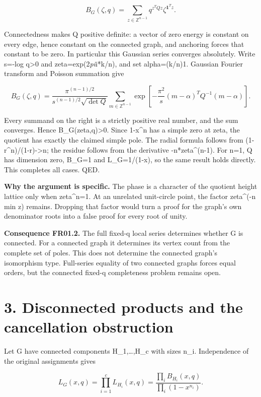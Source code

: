 \documentclass[
  11pt,
  a4paper,
]{report}
\begin{document}
\[
 B_G(\zeta,q)
    =\sum_{z\in\mathbb Z^{n-1}}
       q^{z^TQz}\zeta^{\mathbf1^Tz}.
\]

Connectedness makes Q positive definite: a vector of zero energy is
constant on every edge, hence constant on the connected graph, and
anchoring forces that constant to be zero. In particular this Gaussian
series converges absolutely. Write s=-log q\textgreater0 and
zeta=exp(2\emph{pi}i*k/n), and set alpha=(k/n)1. Gaussian Fourier
transform and Poisson summation give

\[
 \boxed{
 B_G(\zeta,q)=
 \frac{\pi^{(n-1)/2}}{s^{(n-1)/2}\sqrt{\det Q}}
 \sum_{m\in\mathbb Z^{n-1}}
 \exp\!\left[-\frac{\pi^2}{s}
 (m-\alpha)^TQ^{-1}(m-\alpha)\right].}
\]

Every summand on the right is a strictly positive real number, and the
sum converges. Hence B\_G(zeta,q)\textgreater0. Since 1-x\^{}n has a
simple zero at zeta, the quotient has exactly the claimed simple pole.
The radial formula follows from (1-r\^{}n)/(1-r)-\textgreater n; the
residue follows from the derivative -n*zeta\^{}(n-1). For n=1, Q has
dimension zero, B\_G=1 and L\_G=1/(1-x), so the same result holds
directly. This completes all cases. QED.

\textbf{Why the argument is specific.} The phase is a character of the
quotient height lattice only when zeta\^{}n=1. At an unrelated
unit-circle point, the factor zeta\^{}(-n min z) remains. Dropping that
factor would turn a proof for the graph's own denominator roots into a
false proof for every root of unity.

\textbf{Consequence FR01.2.} The full fixed-q local series determines
whether G is connected. For a connected graph it determines its vertex
count from the complete set of poles. This does not determine the
connected graph's isomorphism type. Full-series equality of two
connected graphs forces equal orders, but the connected fixed-q
completeness problem remains open.

\hypertarget{disconnected-products-and-the-cancellation-obstruction}{%
\section{3. Disconnected products and the cancellation
obstruction}\label{disconnected-products-and-the-cancellation-obstruction}}

Let G have connected components H\_1,\ldots,H\_c with sizes n\_i.
Independence of the original assignments gives

\[
 L_G(x,q)=\prod_{i=1}^c L_{H_i}(x,q)
         =\frac{\prod_i B_{H_i}(x,q)}{\prod_i(1-x^{n_i})}.
\]
\end{document}

